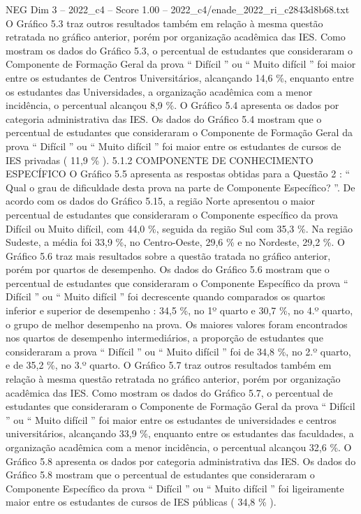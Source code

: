 \begin{textsample}{NEG Dim 3 – 2022\_c4 – Score 1.00 – 2022\_c4/enade\_2022\_ri\_c2843d8b68.txt}
O Gráfico 5.3 traz outros resultados também em relação à mesma questão retratada no gráfico anterior, porém por organização acadêmica das IES.
Como mostram os dados do Gráfico 5.3, o percentual de estudantes que consideraram o Componente de Formação Geral da prova “ Difícil ” ou “ Muito difícil ” foi maior entre os estudantes de Centros Universitários, alcançando 14,6 \%, enquanto entre os estudantes das Universidades, a organização acadêmica com a menor incidência, o percentual alcançou 8,9 \%.
O Gráfico 5.4 apresenta os dados por categoria administrativa das IES.
Os dados do Gráfico 5.4 mostram que o percentual de estudantes que consideraram o Componente de Formação Geral da prova “ Difícil ” ou “ Muito difícil ” foi maior entre os estudantes de cursos de IES privadas ( 11,9 \% ). 5.1.2 COMPONENTE DE CONHECIMENTO ESPECÍFICO O Gráfico 5.5 apresenta as respostas obtidas para a Questão 2 : “ Qual o grau de dificuldade desta prova na parte de Componente Específico? ”.
De acordo com os dados do Gráfico 5.15, a região Norte apresentou o maior percentual de estudantes que consideraram o Componente específico da prova Difícil ou Muito difícil, com 44,0 \%, seguida da região Sul com 35,3 \%.
Na região Sudeste, a média foi 33,9 \%, no Centro-Oeste, 29,6 \% e no Nordeste, 29,2 \%.
O Gráfico 5.6 traz mais resultados sobre a questão tratada no gráfico anterior, porém por quartos de desempenho.
Os dados do Gráfico 5.6 mostram que o percentual de estudantes que consideraram o Componente Específico da prova “ Difícil ” ou “ Muito difícil ” foi decrescente quando comparados os quartos inferior e superior de desempenho : 34,5 \%, no 1º quarto e 30,7 \%, no 4.º quarto, o grupo de melhor desempenho na prova.
Os maiores valores foram encontrados nos quartos de desempenho intermediários, a proporção de estudantes que consideraram a prova “ Difícil ” ou “ Muito difícil ” foi de 34,8 \%, no 2.º quarto, e de 35,2 \%, no 3.º quarto.
O Gráfico 5.7 traz outros resultados também em relação à mesma questão retratada no gráfico anterior, porém por organização acadêmica das IES.
Como mostram os dados do Gráfico 5.7, o percentual de estudantes que consideraram o Componente de Formação Geral da prova “ Difícil ” ou “ Muito difícil ” foi maior entre os estudantes de universidades e centros universitários, alcançando 33,9 \%, enquanto entre os estudantes das faculdades, a organização acadêmica com a menor incidência, o percentual alcançou 32,6 \%.
O Gráfico 5.8 apresenta os dados por categoria administrativa das IES.
Os dados do Gráfico 5.8 mostram que o percentual de estudantes que consideraram o Componente Específico da prova “ Difícil ” ou “ Muito difícil ” foi ligeiramente maior entre os estudantes de cursos de IES públicas ( 34,8 \% ).

\end{textsample}
